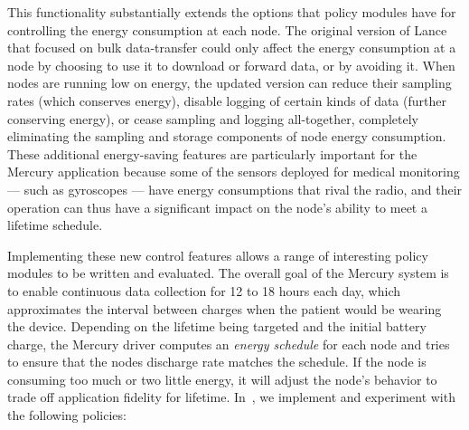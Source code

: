 This functionality substantially extends the options that policy modules have
for controlling the energy consumption at each node. The original version of
Lance that focused on bulk data-transfer could only affect the energy
consumption at a node by choosing to use it to download or forward data, or
by avoiding it. When nodes are running low on energy, the updated version can
reduce their sampling rates (which conserves energy), disable logging of
certain kinds of data (further conserving energy), or cease sampling and
logging all-together, completely eliminating the sampling and storage
components of node energy consumption. These additional energy-saving
features are particularly important for the Mercury application because some
of the sensors deployed for medical monitoring --- such as gyroscopes ---
have energy consumptions that rival the radio, and their operation can thus
have a significant impact on the node's ability to meet a lifetime schedule.

Implementing these new control features allows a range of interesting policy
modules to be written and evaluated. The overall goal of the Mercury system
is to enable continuous data collection for 12 to 18 hours each day, which
approximates the interval between charges when the patient would be wearing
the device. Depending on the lifetime being targeted and the initial battery
charge, the Mercury driver computes an \textit{energy schedule} for each node
and tries to ensure that the nodes discharge rate matches the schedule.  If
the node is consuming too much or two little energy, it will adjust the
node's behavior to trade off application fidelity for lifetime.
In~\cite{mercury-sensys09}, we implement and experiment with the following
policies:

